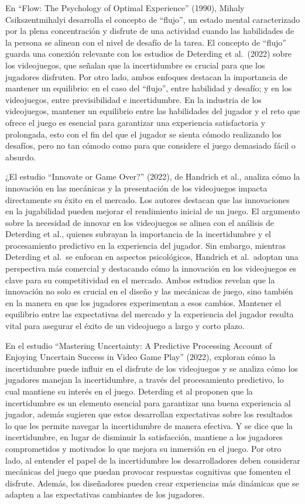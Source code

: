 \documentclass[
  letterpaper,
  DIV=11,
  numbers=noendperiod]{scrreprt}
\begin{document}
En ``Flow: The Psychology of Optimal Experience'' (1990), Mihaly
Csikszentmihalyi desarrolla el concepto de ``flujo'', un estado mental
caracterizado por la plena concentración y disfrute de una actividad
cuando las habilidades de la persona se alinean con el nivel de desafío
de la tarea. El concepto de ``flujo'' guarda una conexión relevante con
los estudios de Deterding et al.~(2022) sobre los videojuegos, que
señalan que la incertidumbre es crucial para que los jugadores
disfruten. Por otro lado, ambos enfoques destacan la importancia de
mantener un equilibrio: en el caso del ``flujo'', entre habilidad y
desafío; y en los videojuegos, entre previsibilidad e incertidumbre. En
la industria de los videojuegos, mantener un equilibrio entre las
habilidades del jugador y el reto que ofrece el juego es esencial para
garantizar una experiencia satisfactoria y prolongada, esto con el fin
del que el jugador se sienta cómodo realizando los desafíos, pero no tan
cómodo como para que considere el juego demasiado fácil o absurdo.

¿El estudio ``Innovate or Game Over?'' (2022), de Handrich et al.,
analiza cómo la innovación en las mecánicas y la presentación de los
videojuegos impacta directamente su éxito en el mercado. Los autores
destacan que las innovaciones en la jugabilidad pueden mejorar el
rendimiento inicial de un juego. El argumento sobre la necesidad de
innovar en los videojuegos se alinea con el análisis de Deterding et
al., quienes subrayan la importancia de la incertidumbre y el
procesamiento predictivo en la experiencia del jugador. Sin embargo,
mientras Deterding et al.~se enfocan en aspectos psicológicos, Handrich
et al.~adoptan una perspectiva más comercial y destacando cómo la
innovación en los videojuegos es clave para su competitividad en el
mercado. Ambos estudios revelan que la innovación no solo es crucial en
el diseño y las mecánicas de juego, sino también en la manera en que los
jugadores experimentan a esos cambios. Mantener el equilibrio entre las
expectativas del mercado y la experiencia del jugador resulta vital para
asegurar el éxito de un videojuego a largo y corto plazo.

En el estudio ``Mastering Uncertainty: A Predictive Processing Account
of Enjoying Uncertain Success in Video Game Play'' (2022), exploran cómo
la incertidumbre puede influir en el disfrute de los videojuegos y se
analiza cómo los jugadores manejan la incertidumbre, a través del
procesamiento predictivo, lo cual mantiene su interés en el juego.
Deterding et al proponen que la incertidumbre es un elemento esencial
para garantizar una buena experiencia al jugador, además sugieren que
estos desarrollan expectativas sobre los resultados lo que les permite
navegar la incertidumbre de manera efectiva. Y se dice que la
incertidumbre, en lugar de disminuir la satisfacción, mantiene a los
jugadores comprometidos y motivados lo que mejora su inmersión en el
juego. Por otro lado, al entender el papel de la incertidumbre los
desarrolladores deben considerar mecánicas del juego que puedan provocar
respuestas cognitivas que fomenten el disfrute. Además, los diseñadores
pueden crear experiencias más dinámicas que se adapten a las
expectativas cambiantes de los jugadores.
\end{document}
